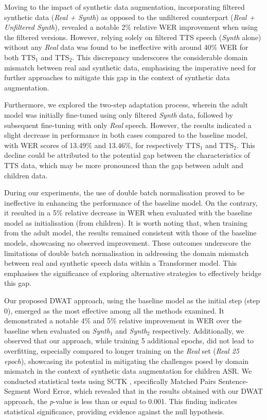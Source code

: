 Moving to the impact of synthetic data augmentation, incorporating filtered synthetic data (\textit{Real +  Synth}) as opposed to the unfiltered counterpart (\textit{Real + Unfiltered Synth}), revealed a notable 2\% relative \ac{WER} improvement when using the filtered versions. However, relying solely on filtered \ac{TTS} speech (\textit{Synth} alone) without any \textit{Real} data was found to be ineffective with around 40\% \ac{WER} for both TTS$_1$ and TTS$_2$. This discrepancy underscores the considerable domain mismatch between real and synthetic data, emphasising the imperative need for further approaches to mitigate this gap in the context of synthetic data augmentation.

Furthermore, we explored the two-step adaptation process, wherein the adult model was initially fine-tuned using only filtered \textit{Synth} data, followed by subsequent fine-tuning with only \textit{Real} speech. However, the results indicated a slight decrease in performance in both cases compared to the baseline model, with \ac{WER} scores of 13.49\% and 13.46\%, for respectively TTS$_1$ and TTS$_2$. This decline could be attributed to the potential gap between the characteristics of \ac{TTS} data, which may be more pronounced than the gap between adult and children data.


During our experiments, the use of double batch normalisation proved to be ineffective in enhancing the performance of the baseline model. On the contrary, it resulted in a 5\% relative decrease in \ac{WER}  when evaluated with the baseline model as initialisation (from children). It is worth noting that, when training from the adult model, the results remained consistent with those of the baseline models, showcasing no observed improvement. These outcomes underscore the limitations of double batch normalisation in addressing the domain mismatch between real and synthetic speech data within a Transformer model. This emphasises the significance of exploring alternative strategies to effectively bridge this gap.


Our proposed \ac{DWAT} approach, using the baseline model as the initial step (step 0), emerged as the most effective among all the methods examined. It demonstrated a notable 4\% and 5\% relative improvement in \ac{WER} over the baseline when evaluated on \textit{Synth$_1$} and \textit{Synth$_2$} respectively. Additionally, we observed that our approach, while training 5 additional epochs, did not lead to overfitting, especially compared to longer training on the \textit{Real} set (\textit{Real 25 epoch}), showcasing its potential in mitigating the challenges posed by domain mismatch in the context of synthetic data augmentation for children \ac{ASR}. We conducted statistical tests using SCTK \cite{SCTK_nist}, specifically Matched Pairs Sentence-Segment Word Error, which revealed that in the results obtained with our \ac{DWAT} approach, the \textit{p}-value is less than or equal to 0.001. This finding indicates statistical significance, providing evidence against the null hypothesis.


